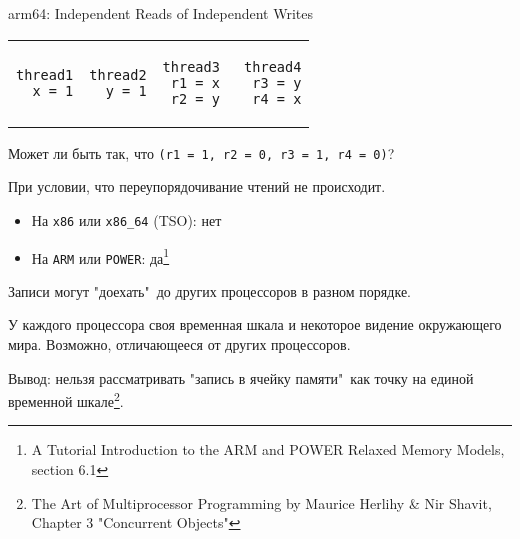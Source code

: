 \begin{frame}[fragile]{arm64: Independent Reads of Independent Writes}


\begin{tabular}{p{} p{} p{} p{}}
\begin{verbatim}
thread1
  x = 1
\end{verbatim}

& 

\begin{verbatim}
thread2
  y = 1
\end{verbatim}

&

\begin{verbatim}
thread3
 r1 = x
 r2 = y 
\end{verbatim}

&

\begin{verbatim}
thread4
 r3 = y
 r4 = x
\end{verbatim}
\end{tabular}


\pause
Может ли быть так, что \texttt{(r1 = 1, r2 = 0, r3 = 1, r4 = 0)}?


\pause
При условии, что переупорядочивание чтений не происходит.

\pause
\begin{itemize}
\item На \texttt{x86} или \texttt{x86\_64} (TSO): нет

\pause
\item На \texttt{ARM} или \texttt{POWER}: да\footnote<5->{\tiny A Tutorial Introduction to the ARM and POWER Relaxed Memory Models, section 6.1}
\end{itemize}

\pause
Записи могут "доехать"\ до других процессоров в разном порядке.

\pause
У каждого процессора своя временная шкала и некоторое видение окружающего мира. Возможно, отличающееся от других процессоров.

\pause
Вывод: нельзя рассматривать "запись в ячейку памяти"\ как точку на единой временной шкале\footnote<8->{\tiny The Art of Multiprocessor Programming by Maurice Herlihy \& Nir Shavit, Chapter 3 "Concurrent Objects"}.
\end{frame}


